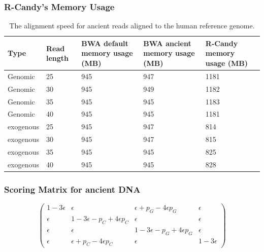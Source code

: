 \documentclass{beamer}
\begin{document}
\begin{frame}[shrink=15]
\frametitle{R-Candy's Memory Usage}

\begin{table}[H]
\center
    \begin{tabular}{ | l |p{1.25cm} | p{2cm} | p{2cm} |p{1.75cm}| }
    \hline
  	\textbf{\footnotesize Type} & \textbf{\footnotesize Read length }&\textbf{\footnotesize BWA  
  		default memory usage (MB) }
  	&\textbf{\footnotesize BWA ancient memory usage (MB) } 
  	& \textbf{\footnotesize R-Candy memory usage (MB) }\\ \hline
 	  Genomic    & 25  & 945 &  947   &  1181 \\ \hline
      Genomic    & 30  & 945 &  949  &  1182 \\ \hline
      Genomic    & 35  & 945 &  945   &  1183 \\ \hline
 	  Genomic	 & 40  & 945 &  945   &  1181 \\ \hline
 	  exogenous  & 25  & 945 &  947   &  814 \\ \hline
      exogenous  & 30  & 945 &  947   &  815 \\ \hline
 	  exogenous  & 35  & 945 &  945   &  825 \\ \hline
 	  exogenous  & 40  & 945 &  945   &  828 \\ \hline
   \end{tabular}
{\caption*{The alignment speed for ancient reads aligned to 
the human reference genome.}}
\label{speed-RG}
\end{table}

\end{frame}


\begin{frame}[shrink=13]
\frametitle{ Scoring Matrix for ancient DNA}

\vskip 2cm
\begin{equation*}
\left( \begin{array}{cccc}
1 - 3 \epsilon &       \epsilon                            &       \epsilon + p_{G} - 4 \epsilon p_{G} &       \epsilon \\
      \epsilon & 1 - 3 \epsilon - p_{C} + 4 \epsilon p_{C} &       \epsilon                            &       \epsilon \\
      \epsilon &       \epsilon                            & 1 - 3 \epsilon - p_{G} + 4 \epsilon p_{G} &       \epsilon \\
      \epsilon &       \epsilon + p_{C} - 4 \epsilon p_{C} &       \epsilon                            & 1 - 3 \epsilon 
\end{array} \right)
\end{equation*}

\end{frame}

\end{document}
